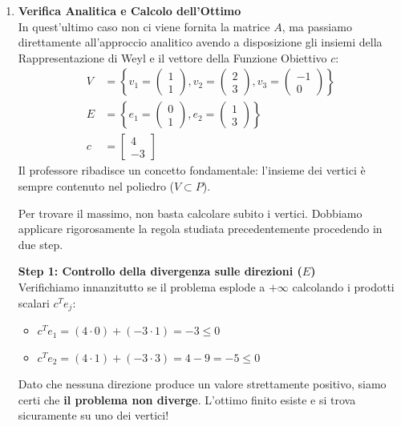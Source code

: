 \documentclass[12pt, a4paper]{article}
\begin{document}
\begin{enumerate}[label=\textbf{Esercizio \arabic*:}, itemsep=15pt, parsep=5pt, leftmargin=*]
		\item \textbf{Verifica Analitica e Calcolo dell'Ottimo}\\
		In quest'ultimo caso non ci viene fornita la matrice $A$, ma passiamo direttamente all'approccio analitico avendo a disposizione gli insiemi della Rappresentazione di Weyl e il vettore della Funzione Obiettivo $c$:
		\[
		\begin{aligned}
			V &= \left\{ v_1=\begin{pmatrix} 1 \\ 1 \end{pmatrix}, v_2=\begin{pmatrix} 2 \\ 3 \end{pmatrix}, v_3=\begin{pmatrix} -1 \\ 0 \end{pmatrix} \right\} \\[0.4cm]
			E &= \left\{ e_1=\begin{pmatrix} 0 \\ 1 \end{pmatrix}, e_2=\begin{pmatrix} 1 \\ 3 \end{pmatrix} \right\} \\[0.4cm]
			c &= \begin{bmatrix} 4 \\ -3 \end{bmatrix}
		\end{aligned}
		\]
		Il professore ribadisce un concetto fondamentale: l'insieme dei vertici è sempre contenuto nel poliedro ($V \subset P$). 
		
		Per trovare il massimo, non basta calcolare subito i vertici. Dobbiamo applicare rigorosamente la regola studiata precedentemente procedendo in due step.
		
		\textbf{Step 1: Controllo della divergenza sulle direzioni ($E$)}\\
		Verifichiamo innanzitutto se il problema esplode a $+\infty$ calcolando i prodotti scalari $c^T e_j$:
		\begin{itemize}
			\item $c^T e_1 = (4 \cdot 0) + (-3 \cdot 1) = -3 \leq 0$
			\item $c^T e_2 = (4 \cdot 1) + (-3 \cdot 3) = 4 - 9 = -5 \leq 0$
		\end{itemize}
		Dato che nessuna direzione produce un valore strettamente positivo, siamo certi che \textbf{il problema non diverge}. L'ottimo finito esiste e si trova sicuramente su uno dei vertici!
		

\end{enumerate}
\end{document}
